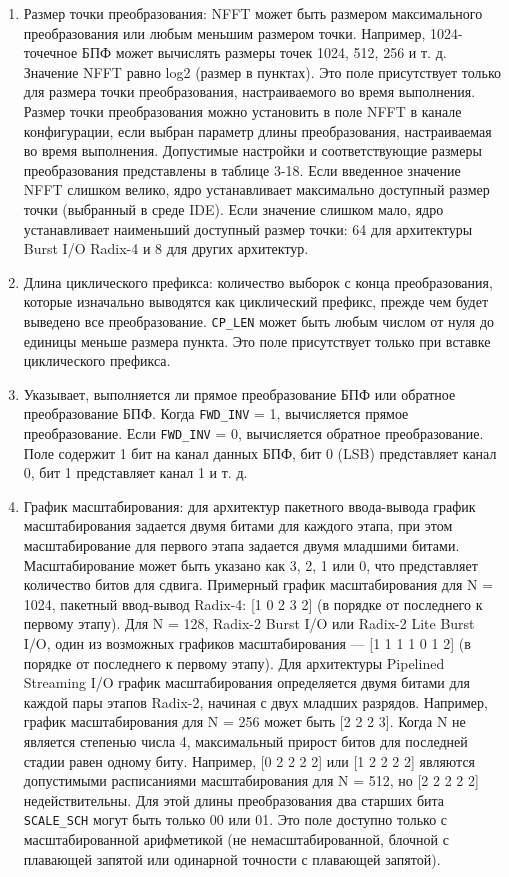 \begin{enumerate}
	\item Размер точки преобразования: NFFT может быть размером максимального преобразования или любым меньшим размером точки. Например, 1024-точечное БПФ может вычислять размеры точек 1024, 512, 256 и т. д. Значение NFFT равно log2 (размер в пунктах). Это поле присутствует только для размера точки преобразования, настраиваемого во время выполнения.
	Размер точки преобразования можно установить в поле NFFT в канале конфигурации, если выбран параметр длины преобразования, настраиваемая во время выполнения. Допустимые настройки и соответствующие размеры преобразования представлены в таблице 3-18. Если введенное значение NFFT слишком велико, ядро устанавливает максимально доступный размер точки (выбранный в среде IDE). Если значение слишком мало, ядро устанавливает наименьший доступный размер точки: 64 для архитектуры Burst I/O Radix-4 и 8 для других архитектур.
	\item Длина циклического префикса: количество выборок с конца преобразования, которые изначально выводятся как циклический префикс, прежде чем будет выведено все преобразование. \verb|CP_LEN| может быть любым числом от нуля до единицы меньше размера пункта. Это поле присутствует только при вставке циклического префикса.
	\item Указывает, выполняется ли прямое преобразование БПФ или обратное преобразование БПФ. Когда \verb|FWD_INV| = 1, вычисляется прямое преобразование. Если \verb|FWD_INV| = 0, вычисляется обратное преобразование. Поле содержит 1 бит на канал данных БПФ, бит 0 (LSB) представляет канал 0, бит 1 представляет канал 1 и т. д.
	\item График масштабирования: для архитектур пакетного ввода-вывода график масштабирования задается двумя битами для каждого этапа, при этом масштабирование для первого этапа задается двумя младшими битами. Масштабирование может быть указано как 3, 2, 1 или 0, что представляет количество битов для сдвига. Примерный график масштабирования для N = 1024, пакетный ввод-вывод Radix-4: [1 0 2 3 2] (в порядке от последнего к первому этапу). Для N = 128, Radix-2 Burst I/O или Radix-2 Lite Burst I/O, один из возможных графиков масштабирования — [1 1 1 1 0 1 2] (в порядке от последнего к первому этапу). Для архитектуры Pipelined Streaming I/O график масштабирования определяется двумя битами для каждой пары этапов Radix-2, начиная с двух младших разрядов. Например, график масштабирования для N = 256 может быть [2 2 2 3]. Когда N не является степенью числа 4, максимальный прирост битов для последней стадии равен одному биту. Например, [0 2 2 2 2] или [1 2 2 2 2] являются допустимыми расписаниями масштабирования для N = 512, но [2 2 2 2 2] недействительны. Для этой длины преобразования два старших бита \verb|SCALE_SCH| могут быть только 00 или 01. Это поле доступно только с масштабированной арифметикой (не немасштабированной, блочной с плавающей запятой или одинарной точности с плавающей запятой).
\end{enumerate} 

